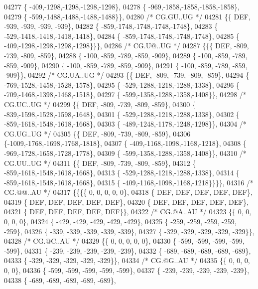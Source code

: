 \begin{DoxyCode}
04277 \{ -409,-1298,-1298,-1298,-1298\},
04278 \{ -969,-1858,-1858,-1858,-1858\},
04279 \{ -599,-1488,-1488,-1488,-1488\}\},
04280 \textcolor{comment}{/* CG.GU..UG */}
04281 \{\{  DEF, -939, -939, -939, -939\},
04282 \{ -859,-1748,-1748,-1748,-1748\},
04283 \{ -529,-1418,-1418,-1418,-1418\},
04284 \{ -859,-1748,-1748,-1748,-1748\},
04285 \{ -409,-1298,-1298,-1298,-1298\}\}\},
04286 \textcolor{comment}{/* CG.U@..UG */}
04287 \{\{\{  DEF, -809, -739, -809, -859\},
04288 \{ -100, -859, -789, -859, -909\},
04289 \{ -100, -859, -789, -859, -909\},
04290 \{ -100, -859, -789, -859, -909\},
04291 \{ -100, -859, -789, -859, -909\}\},
04292 \textcolor{comment}{/* CG.UA..UG */}
04293 \{\{  DEF, -809, -739, -809, -859\},
04294 \{ -769,-1528,-1458,-1528,-1578\},
04295 \{ -529,-1288,-1218,-1288,-1338\},
04296 \{ -709,-1468,-1398,-1468,-1518\},
04297 \{ -599,-1358,-1288,-1358,-1408\}\},
04298 \textcolor{comment}{/* CG.UC..UG */}
04299 \{\{  DEF, -809, -739, -809, -859\},
04300 \{ -839,-1598,-1528,-1598,-1648\},
04301 \{ -529,-1288,-1218,-1288,-1338\},
04302 \{ -859,-1618,-1548,-1618,-1668\},
04303 \{ -489,-1248,-1178,-1248,-1298\}\},
04304 \textcolor{comment}{/* CG.UG..UG */}
04305 \{\{  DEF, -809, -739, -809, -859\},
04306 \{-1009,-1768,-1698,-1768,-1818\},
04307 \{ -409,-1168,-1098,-1168,-1218\},
04308 \{ -969,-1728,-1658,-1728,-1778\},
04309 \{ -599,-1358,-1288,-1358,-1408\}\},
04310 \textcolor{comment}{/* CG.UU..UG */}
04311 \{\{  DEF, -809, -739, -809, -859\},
04312 \{ -859,-1618,-1548,-1618,-1668\},
04313 \{ -529,-1288,-1218,-1288,-1338\},
04314 \{ -859,-1618,-1548,-1618,-1668\},
04315 \{ -409,-1168,-1098,-1168,-1218\}\}\}\},
04316 \textcolor{comment}{/* CG.@@..AU */}
04317 \{\{\{\{    0,    0,    0,    0,    0\},
04318 \{  DEF,  DEF,  DEF,  DEF,  DEF\},
04319 \{  DEF,  DEF,  DEF,  DEF,  DEF\},
04320 \{  DEF,  DEF,  DEF,  DEF,  DEF\},
04321 \{  DEF,  DEF,  DEF,  DEF,  DEF\}\},
04322 \textcolor{comment}{/* CG.@A..AU */}
04323 \{\{    0,    0,    0,    0,    0\},
04324 \{ -429, -429, -429, -429, -429\},
04325 \{ -259, -259, -259, -259, -259\},
04326 \{ -339, -339, -339, -339, -339\},
04327 \{ -329, -329, -329, -329, -329\}\},
04328 \textcolor{comment}{/* CG.@C..AU */}
04329 \{\{    0,    0,    0,    0,    0\},
04330 \{ -599, -599, -599, -599, -599\},
04331 \{ -239, -239, -239, -239, -239\},
04332 \{ -689, -689, -689, -689, -689\},
04333 \{ -329, -329, -329, -329, -329\}\},
04334 \textcolor{comment}{/* CG.@G..AU */}
04335 \{\{    0,    0,    0,    0,    0\},
04336 \{ -599, -599, -599, -599, -599\},
04337 \{ -239, -239, -239, -239, -239\},
04338 \{ -689, -689, -689, -689, -689\},

\end{DoxyCode}
